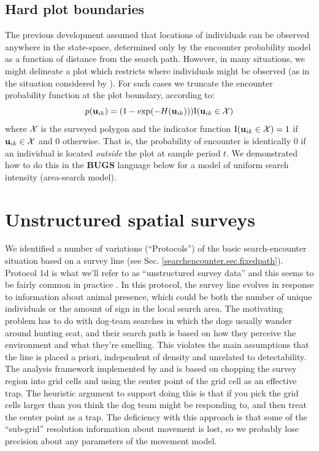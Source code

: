 \subsection{Hard plot boundaries}

The previous development assumed that locations of individuals can be
observed anywhere in the state-space, determined only by the encounter
probability model as a function of distance from the search path.
However, in many situations, we might delineate a plot which restricts
where individuals might be observed (as in the situation considered by
\citet{royle_young:2008}).  For such cases we truncate the encounter
probability function at the plot boundary, according to:
\begin{equation}
p({\bf u}_{ik}) = (1- \exp(-H({\bf u}_{ik}))) \mbox{I}({\bf u}_{ik} \in {\cal X})
\label{search-encounter.eq.hardplot}
\end{equation}
where ${\cal X}$ is the surveyed polygon and the indicator function
$\mbox{I}({\bf u}_{ik} \in {\cal X}) = 1$ if ${\bf u}_{ik} \in {\cal
  X}$ and 0 otherwise.  That is, the probability of encounter is
identically 0 if an individual is located {\it outside} the plot at
sample period $t$.  We demonstrated how to do this in the {\bf BUGS}
language below for a model of uniform search intensity (area-search
model).



\section{Unstructured spatial surveys}

We identified a number of variations (``Protocols'') of the basic search-encounter
situation based on a survey line
(see Sec. \ref{searchencounter.sec.fixedpath}). 
Protocol 1d is what we'll refer to as 
 ``unstructured survey data'' and this seems to be fairly common in practice
\citep{thompson_etal:2012, russell_etal:2012}. 
In this protocol, the survey line evolves in response to information
about animal presence, which could be both the number of unique
individuals or the amount of sign in the local search area. The
motivating problem has to do with dog-team searches in which the dogs
usually wander around hunting scat, and their search path is based on
how they perceive the environment and what they're smelling. 
This violates the main assumptions that the line is placed a priori,
independent of density and unrelated to detectability.
The analysis framework implemented by
\citet{thompson_etal:2012} and \citet{russell_etal:2012} is based on
chopping the survey region into grid cells and using the center point
of the grid cell as an effective trap.  The heuristic argument to
support doing this is that if you pick the grid cells 
 larger than you think the dog team might be
responding to, and then treat the center point as a trap.  
The deficiency with this approach is that some of the ``sub-grid''
resolution information about movement is lost, so we probably lose
precision about any parameters of the movement model. 

